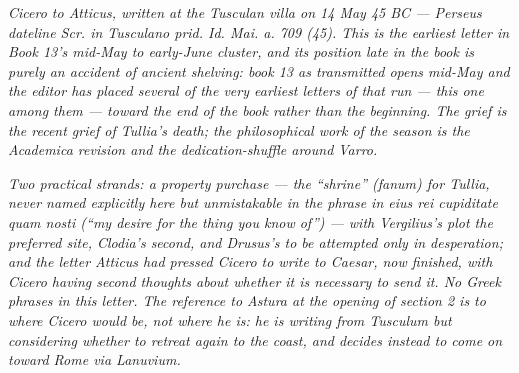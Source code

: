 
\textit{Cicero to Atticus, written at the Tusculan villa on 14 May
45 BC --- Perseus dateline \textit{Scr. in Tusculano prid. Id. Mai.
a. 709 (45)}. This is the earliest letter in Book 13's mid-May to
early-June cluster, and its position late in the book is purely an
accident of ancient shelving: book 13 as transmitted opens mid-May
and the editor has placed several of the very earliest letters of
that run --- this one among them --- toward the end of the book
rather than the beginning. The grief is the recent grief of
Tullia's death; the philosophical work of the season is the
\textit{Academica} revision and the dedication-shuffle around
Varro.}

\textit{Two practical strands: a property purchase --- the
``shrine'' (\textit{fanum}) for Tullia, never named explicitly here
but unmistakable in the phrase \textit{in eius rei cupiditate quam
nosti} (``my desire for the thing you know of'') --- with
Vergilius's plot the preferred site, Clodia's second, and Drusus's
to be attempted only in desperation; and the letter Atticus had
pressed Cicero to write to Caesar, now finished, with Cicero
having second thoughts about whether it is necessary to send it.
No Greek phrases in this letter. The reference to Astura at the
opening of section 2 is to where Cicero would be, not where he is:
he is writing from Tusculum but considering whether to retreat
again to the coast, and decides instead to come on toward Rome
via Lanuvium.}
